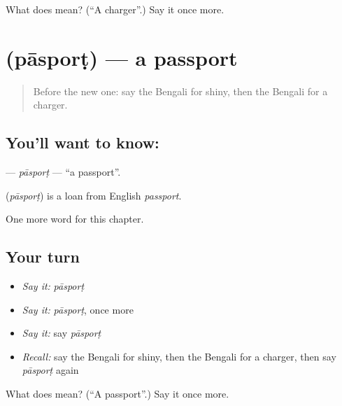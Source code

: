 \begin{tcolorbox}[breakable,colback=teal!4,colframe=teal!35!black,title={Before you move on}]
What does  mean? (\textquotedblleft{}A charger\textquotedblright{}.) Say it once more.
\end{tcolorbox}
\section[\texorpdfstring{\bn{পাসপোর্ট} (pāsporṭ)}{পাসপোর্ট (pāsporṭ)}]{ (pāsporṭ) — a passport}

\label{lesson:BN-C248-pasport}



\begin{quote}
Before the new one: say the Bengali for shiny, then the Bengali for a charger.
\end{quote}

\subsection*{You'll want to know: }
\textbf{} — \emph{pāsporṭ} — \textquotedblleft{}a passport\textquotedblright{}.

\begin{cousinweb}
\textbf{} (\emph{pāsporṭ}) is a loan from English \emph{passport}.
\end{cousinweb}

\begin{grammarlens}[title={What you've built}]
One more word for this chapter.
\end{grammarlens}

\subsection*{Your turn}
\begin{itemize}
\raggedright
  \item \emph{Say it:} \emph{pāsporṭ}
  \item \emph{Say it:} \emph{pāsporṭ}, once more
  \item \emph{Say it:} say \emph{pāsporṭ}
  \item \emph{Recall:} say the Bengali for shiny, then the Bengali for a charger, then say \emph{pāsporṭ} again
\end{itemize}

\begin{tcolorbox}[breakable,colback=teal!4,colframe=teal!35!black,title={Before you move on}]
What does  mean? (\textquotedblleft{}A passport\textquotedblright{}.) Say it once more.
\end{tcolorbox}
